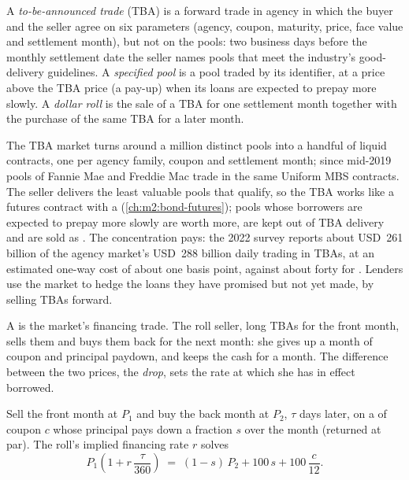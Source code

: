 \begin{definition}\label{def:m2:mortgages-and-agencies:tba}
A \emph{to-be-announced trade} (TBA) is a forward
trade in agency  in which the buyer and the seller agree on six
parameters (agency, coupon, maturity, price, face value and settlement month),
but not on the pools: two business days before the monthly settlement date the
seller names pools that meet the industry's good-delivery guidelines. A
\emph{specified pool} is a pool traded by its
identifier, at a price above the TBA price (a pay-up) when its loans are
expected to prepay more slowly. A \emph{dollar roll} is the
sale of a TBA for one settlement month together with the purchase of the same
TBA for a later month.
\end{definition}

The TBA market turns around a million distinct pools into a handful of liquid
contracts, one per agency family, coupon and settlement month; since mid-2019
pools of Fannie Mae and Freddie Mac trade in the same Uniform MBS contracts. The
seller delivers the least valuable pools that qualify, so the TBA works like a
futures contract with a  (\cref{ch:m2:bond-futures}); pools
whose borrowers are expected to prepay more slowly are worth more, are kept out
of TBA delivery and are sold as . The concentration pays: the 2022 survey reports about USD~261
billion of the agency market's USD~288 billion daily trading in TBAs, at an
estimated one-way cost of about one basis point, against about forty for
. Lenders use the market to hedge the loans they have promised
but not yet made, by selling TBAs forward.

A  is the market's financing trade. The roll seller, long TBAs for
the front month, sells them and buys them back for the next month: she gives
up a month of coupon and principal paydown, and keeps the cash for a month.
The difference between the two prices, the \emph{drop}, sets the rate at which
she has in effect borrowed.

\begin{proposition}\label{prop:m2:mortgages-and-agencies:roll}
Sell the front month at $P_1$ and buy the back month at $P_2$, $\tau$ days
later, on a  of coupon $c$ whose principal pays down a fraction
$s$ over the month (returned at par). The roll's implied financing rate $r$
solves
\[
P_1\left(1 + r\,\frac{\tau}{360}\right) \;=\; (1-s)\,P_2 + 100\,s + 100\,\frac{c}{12}.
\]
\end{proposition}

